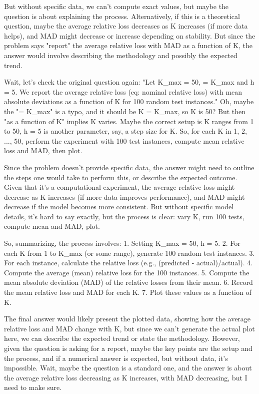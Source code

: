 But without specific data, we can't compute exact values, but maybe the question is about explaining the process. Alternatively, if this is a theoretical question, maybe the average relative loss decreases as K increases (if more data helps), and MAD might decrease or increase depending on stability. But since the problem says "report" the average relative loss with MAD as a function of K, the answer would involve describing the methodology and possibly the expected trend.

Wait, let's check the original question again: "Let K_max = 50, = K_max and h = 5. We report the average relative loss (eq: nominal relative loss) with mean absolute deviations as a function of K for 100 random test instances." Oh, maybe the "= K_max" is a typo, and it should be K = K_max, so K is 50? But then "as a function of K" implies K varies. Maybe the correct setup is K ranges from 1 to 50, h = 5 is another parameter, say, a step size for K. So, for each K in 1, 2, ..., 50, perform the experiment with 100 test instances, compute mean relative loss and MAD, then plot.

Since the problem doesn't provide specific data, the answer might need to outline the steps one would take to perform this, or describe the expected outcome. Given that it's a computational experiment, the average relative loss might decrease as K increases (if more data improves performance), and MAD might decrease if the model becomes more consistent. But without specific model details, it's hard to say exactly, but the process is clear: vary K, run 100 tests, compute mean and MAD, plot.

So, summarizing, the process involves:
1. Setting K_max = 50, h = 5.
2. For each K from 1 to K_max (or some range), generate 100 random test instances.
3. For each instance, calculate the relative loss (e.g., (predicted - actual)/actual).
4. Compute the average (mean) relative loss for the 100 instances.
5. Compute the mean absolute deviation (MAD) of the relative losses from their mean.
6. Record the mean relative loss and MAD for each K.
7. Plot these values as a function of K.

The final answer would likely present the plotted data, showing how the average relative loss and MAD change with K, but since we can't generate the actual plot here, we can describe the expected trend or state the methodology. However, given the question is asking for a report, maybe the key points are the setup and the process, and if a numerical answer is expected, but without data, it's impossible. Wait, maybe the question is a standard one, and the answer is about the average relative loss decreasing as K increases, with MAD decreasing, but I need to make sure.

